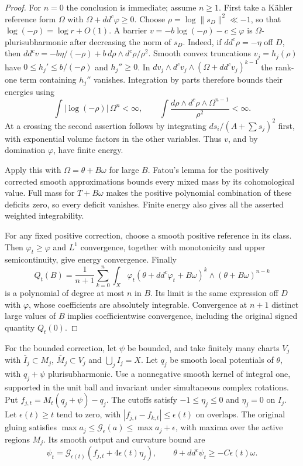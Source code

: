 \begin{proof}
For $n=0$ the conclusion is immediate; assume $n\geq1$.
First take a Kähler reference form $\Omega$ with
$\Omega+dd^c\varphi\geq0$. Choose
$\rho=\log\|s_D\|^2\ll-1$, so that
$\log(-\rho)=\log r+O(1)$. A barrier
$v=-b\log(-\rho)-c\leq\varphi$ is $\Omega$-plurisubharmonic
after decreasing the norm of $s_D$. Indeed, if $dd^c\rho=-\eta$
off $D$, then
$dd^cv=-b\eta/(-\rho)+b\,d\rho\wedge d^c\rho/\rho^2$.
Smooth convex truncations $v_j=h_j(\rho)$ have
$0\leq h_j'\leq b/(-\rho)$ and $h_j''\geq0$.
In
$dv_j\wedge d^cv_j\wedge(\Omega+dd^cv_j)^{k-1}$ the rank-one
term containing $h_j''$ vanishes. Integration by parts therefore
bounds their energies using
\[
 \int|\log(-\rho)|\,\Omega^n<\infty,\qquad
 \int\frac{d\rho\wedge d^c\rho\wedge\Omega^{n-1}}{\rho^2}<\infty.
\]
At a crossing the second assertion follows by integrating
$ds_i/(A+\sum s_j)^2$ first, with exponential volume factors in
the other variables. Thus $v$, and by domination $\varphi$, have
finite energy.

Apply this with $\Omega=\theta+B\omega$ for large $B$.
Fatou's lemma for the positively corrected smooth approximations
bounds every mixed mass by its cohomological value. Full mass for
$T+B\omega$ makes the positive polynomial combination of these
deficits zero, so every deficit vanishes. Finite energy also gives
all the asserted weighted integrability.

For any fixed positive correction, choose a smooth positive reference
in its class. Then $\varphi_t\geq\varphi$ and $L^1$ convergence,
together with monotonicity and upper semicontinuity, give energy
convergence. Finally
\[
 Q_t(B)=\frac1{n+1}\sum_{k=0}^n
  \int_X\varphi_t
       (\theta+dd^c\varphi_t+B\omega)^k
                       \wedge(\theta+B\omega)^{n-k}
\]
is a polynomial of degree at most $n$ in $B$. Its limit is the same
expression off $D$ with $\varphi$, whose coefficients are absolutely
integrable. Convergence at $n+1$ distinct large values of $B$
implies coefficientwise convergence, including the original signed
quantity $Q_t(0)$.
\end{proof}

For the bounded correction, let $\psi$ be bounded, and take finitely
many charts $V_j$ with
$\overline I_j\subset M_j$, $\overline M_j\subset V_j$ and
$\bigcup_jI_j=X$. Let $q_j$ be smooth local potentials of $\theta$,
with $q_j+\psi$ plurisubharmonic. Use a nonnegative smooth kernel
of integral one, supported in the unit ball and invariant under
simultaneous complex rotations. Put $f_{j,t}=M_t(q_j+\psi)-q_j$.
The cutoffs satisfy $-1\leq\eta_j\leq0$ and $\eta_j=0$ on $I_j$.
Let $\epsilon(t)\geq t$ tend to zero, with
$|f_{j,t}-f_{k,t}|\leq\epsilon(t)$ on overlaps. The original gluing
satisfies $\max a_j\leq\mathcal G_\epsilon(a)\leq\max a_j+\epsilon$,
with maxima over the active regions $M_j$.
Its smooth output and curvature bound are
\[
 \psi_t=\mathcal G_{\epsilon(t)}(f_{j,t}+4\epsilon(t)\eta_j),
 \qquad \theta+dd^c\psi_t\geq-C\epsilon(t)\omega.
\]

